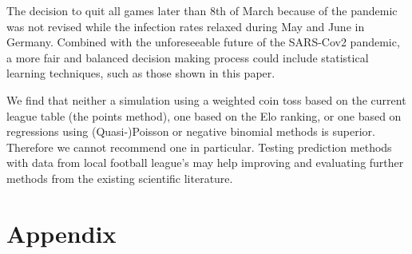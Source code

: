 \documentclass[12pt,a4paper]{article}
\begin{document}
The decision to quit all games later than 8th of March because of the
pandemic was not revised while the infection rates relaxed during May
and June in Germany. Combined with the unforeseeable future of the
SARS-Cov2 pandemic, a more fair and balanced decision making process
could include statistical learning techniques, such as those shown in
this paper.

We find that neither a simulation using a weighted coin toss based on
the current league table (the points method), one based on the Elo
ranking, or one based on regressions using (Quasi-)Poisson or negative
binomial methods is superior. Therefore we cannot recommend one in
particular. Testing prediction methods with data from local football
league's may help improving and evaluating further methods from the
existing scientific literature.

\newpage

\printbibliography

\newpage

\hypertarget{appendix}{%
\section{Appendix}\label{appendix}}
\end{document}
